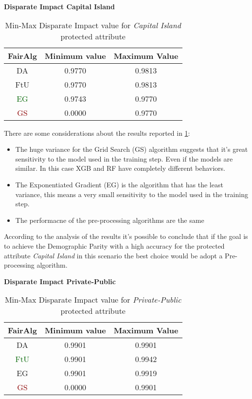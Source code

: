 \textbf{Disparate Impact Capital Island}
\begin{table}
    \centering
    \begin{tabular}{|c|c|c|}
        \hline
        \textbf{FairAlg} & \textbf{Minimum value} & \textbf{Maximum Value} \\
        \hline
        DA & 0.9770 & 0.9813 \\
        \hline
        FtU & 0.9770 & 0.9813 \\
        \hline
        \textcolor{darkgreen}{EG} & 0.9743 & 0.9770 \\
        \hline
        \textcolor{darkred}{GS} & 0.0000 & 0.9770 \\
        \hline
    \end{tabular}
    \caption{Min-Max Disparate Impact value for \emph{Capital Island} protected attribute}
    \label{tab:ci_di}
\end{table}

There are some considerations about the results reported in \cref{tab:ci_di}:

\begin{itemize}

    \item The huge variance for the Grid Search (GS) algorithm suggests that it's great sensitivity to the model used in the training step. Even if the models are similar. In this case XGB and RF have completely different behaviors.

    \item The Exponentiated Gradient (EG) is the algorithm that has the least variance, this means a very small sensitivity to the model used in the training step.

    \item The performacne of the pre-processing algorithms are the same

\end{itemize}

According to the analysis of the results it's possible to conclude that if the goal is to achieve the Demographic Parity with a high accuracy for the protected attribute \emph{Capital Island} in this scenario the best choice would be adopt a Pre-processing algorithm.

\textbf{Disparate Impact Private-Public}
\begin{table}
    \centering
    \begin{tabular}{|c|c|c|}
        \hline
        \textbf{FairAlg} & \textbf{Minimum value} & \textbf{Maximum Value} \\
        \hline
        DA & 0.9901 & 0.9901 \\
        \hline
        \textcolor{darkgreen}{FtU} & 0.9901 & 0.9942 \\
        \hline
        EG & 0.9901 & 0.9919 \\
        \hline
        \textcolor{darkred}{GS} & 0.0000 & 0.9901 \\
        \hline
    \end{tabular}
    \caption{Min-Max Disparate Impact value for \emph{Private-Public} protected attribute}
    \label{tab:pp_di}
\end{table}

